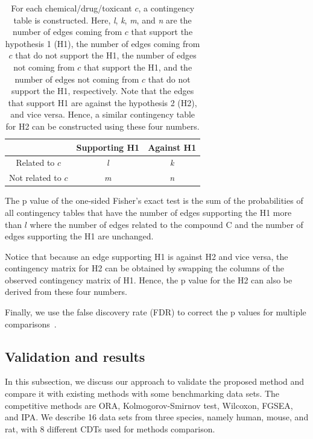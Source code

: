 \begin{table}
\caption{For each chemical/drug/toxicant $c$, a contingency table is constructed. Here, \emph{l}, \emph{k}, \emph{m}, and \emph{n} are the number of edges coming from $c$ that support the hypothesis 1 (H1), the number of edges coming from $c$ that do not support the H1, the number of edges not coming from $c$ that support the H1, and the number of edges not coming from $c$ that do not support the H1, respectively. Note that the edges that support H1 are against the hypothesis 2 (H2), and vice versa. Hence, a similar contingency table for H2 can be constructed using these four numbers.}
\begin{center}
\begin{tabular}{c|cc}
&  Supporting H1& Against H1\\
\hline
Related to $c$& \emph{l} & \emph{k} \\
 Not related to $c$&\emph{m}& \emph{n}  \\
\end{tabular}
\end{center}
\label{ConfusionMatrix}
\end{table}%


The p value of the one-sided Fisher's exact test is the sum of the probabilities of all contingency tables that have the number of edges supporting the H1 more than $l$ where the number of edges related to the compound C and the number of edges supporting the H1 are unchanged.

Notice that because an edge supporting H1 is against H2 and vice versa, the contingency matrix for H2 can be obtained by swapping the columns of the observed contingency matrix of H1. Hence, the p value for the H2 can also be derived from these four numbers.


Finally, we use the false discovery rate (FDR) to correct the p values for multiple comparisons~\cite{Benjamini:1997}.




\subsection{Validation and results}

In this subsection, we discuss our approach to validate the proposed method and compare it with existing methods with some benchmarking data sets. The competitive methods are ORA, Kolmogorov-Smirnov test, Wilcoxon, FGSEA, and IPA. We describe 16 data sets from three species, namely human, mouse, and rat, with 8 different CDTs used for methods comparison. %


